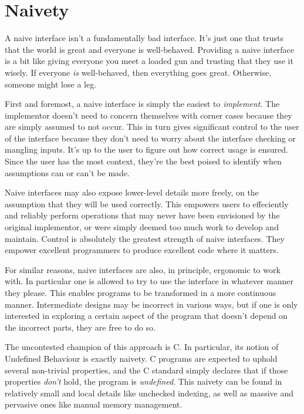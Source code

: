 \section{Naivety}

A naive interface isn't a fundamentally bad interface. It's just one that trusts
that the world is great and everyone is well-behaved. Providing a naive interface
is a bit like giving everyone you meet a loaded gun and trusting that they use
it wisely. If everyone \emph{is} well-behaved, then everything goes great. Otherwise,
someone might lose a leg.

First and foremost, a naive interface
is simply the easiest to \emph{implement}. The implementor doesn't need to concern
themselves with corner cases because they are simply assumed to not occur. This
in turn gives significant control to the user of the interface because they don't
need to worry about the interface checking or mangling inputs. It's up to the user
to figure out how correct usage is ensured. Since the user has the most context,
they're the best poised to identify when assumptions can or can't be made.

Naive interfaces may also expose lower-level details more freely, on the
assumption that they will be used correctly. This empowers users to effeciently
and reliably perform operations that may never have been envisioned by the
original implementor, or were simply deemed too much work to develop and maintain.
Control is absolutely the greatest strength of naive interfaces. They empower
excellent programmers to produce excellent code where it matters.

For similar reasons, naive interfaces are also, in principle, ergonomic to work
with. In particular one is allowed to try to use the interface in whatever
manner they please. This enables programs to be transformed in a more continuous
manner. Intermediate designs may be incorrect in various ways, but if one is
only interested in exploring a certain aspect of the program that doesn't depend
on the incorrect parts, they are free to do so.

The uncontested champion of this approach is C. In particular, its notion of
Undefined Behaviour is exactly naivety. C programs are expected to uphold
several non-trivial properties, and the C standard simply declares that if those
properties \emph{don't} hold, the program is \emph{undefined}. This naivety can be found in
relatively small and local details like unchecked indexing, as well as massive
and pervasive ones like manual memory management.

